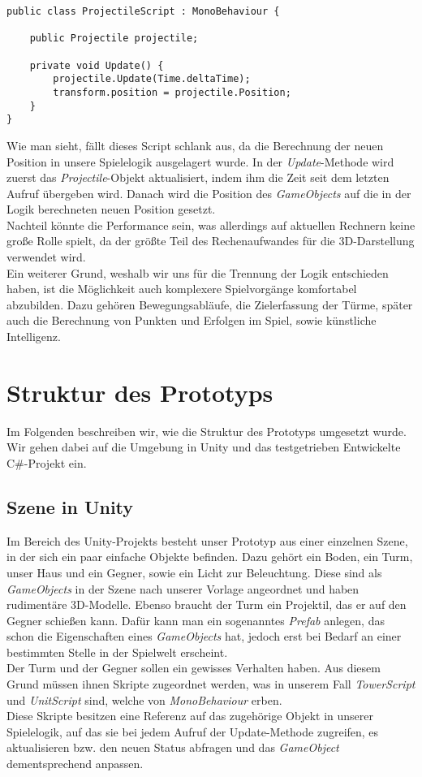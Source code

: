 \begin{lstlisting}[caption={[Script für ein Projektilobjekt]Script für ein Projektilobjekt}]
public class ProjectileScript : MonoBehaviour {

    public Projectile projectile;

    private void Update() {
        projectile.Update(Time.deltaTime);
        transform.position = projectile.Position;
    }
}
\end{lstlisting}
Wie man sieht, fällt dieses Script schlank aus, da die Berechnung der neuen Position in unsere Spielelogik ausgelagert wurde. In der \textit{Update}-Methode wird zuerst das \textit{Projectile}-Objekt aktualisiert, indem ihm die Zeit seit dem letzten Aufruf übergeben wird. Danach wird die Position des \textit{GameObjects} auf die in der Logik berechneten neuen Position gesetzt.\\
Nachteil könnte die Performance sein, was allerdings auf aktuellen Rechnern keine große Rolle spielt, da der größte Teil des Rechenaufwandes für die 3D-Darstellung verwendet wird.\\
Ein weiterer Grund, weshalb wir uns für die Trennung der Logik entschieden haben, ist die Möglichkeit auch komplexere Spielvorgänge komfortabel abzubilden. Dazu gehören Bewegungsabläufe, die Zielerfassung der Türme, später auch die Berechnung von Punkten und Erfolgen im Spiel, sowie künstliche Intelligenz.
\pagebreak

\section{Struktur des Prototyps}
Im Folgenden beschreiben wir, wie die Struktur des Prototyps umgesetzt wurde. Wir gehen dabei auf die Umgebung in Unity und das testgetrieben Entwickelte C\#-Projekt ein.

\subsection{Szene in Unity}
Im Bereich des Unity-Projekts besteht unser Prototyp aus einer einzelnen Szene, in der sich ein paar einfache Objekte befinden. Dazu gehört ein Boden, ein Turm, unser Haus und ein Gegner, sowie ein Licht zur Beleuchtung. Diese sind als \textit{GameObjects} in der Szene nach unserer Vorlage angeordnet und haben rudimentäre 3D-Modelle. Ebenso braucht der Turm ein Projektil, das er auf den Gegner schießen kann. Dafür kann man ein sogenanntes \textit{Prefab} anlegen, das schon die Eigenschaften eines \textit{GameObjects} hat, jedoch erst bei Bedarf an einer bestimmten Stelle in der Spielwelt erscheint.\\
Der Turm und der Gegner sollen ein gewisses Verhalten haben. Aus diesem Grund müssen ihnen Skripte zugeordnet werden, was in unserem Fall \textit{TowerScript} und \textit{UnitScript} sind, welche von \textit{MonoBehaviour} erben.\\
Diese Skripte besitzen eine Referenz auf das zugehörige Objekt in unserer Spielelogik, auf das sie bei jedem Aufruf der Update-Methode zugreifen, es aktualisieren bzw. den neuen Status abfragen und das \textit{GameObject} dementsprechend anpassen. 

